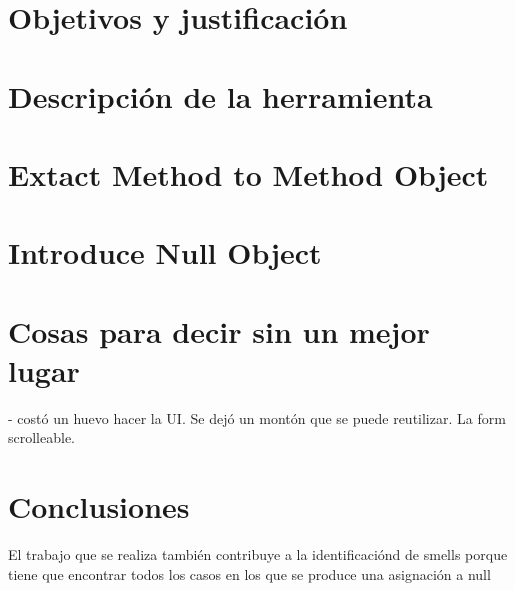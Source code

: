 \documentclass[11pt,a4paper,twoside]{tesis}
\begin{document}
\chapter{Objetivos y justificación}


\chapter{Descripción de la herramienta}


\chapter{Extact Method to Method Object}


\chapter{Introduce Null Object}


\chapter{Cosas para decir sin un mejor lugar}

- costó un huevo hacer la UI. Se dejó un montón que se puede reutilizar. La form scrolleable.

\chapter{Conclusiones}

El trabajo que se realiza también contribuye a la identificaciónd de smells porque tiene que
encontrar todos los casos en los que se produce una asignación a null



\backmatter
%
\end{document}
